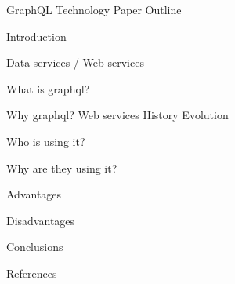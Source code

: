 

GraphQL Technology Paper Outline

Introduction

   Data services / Web services

   What is graphql?

   Why graphql?
      Web services
      History
      Evolution

Who is using it?

Why are they using it?

Advantages

Disadvantages

Conclusions

References
